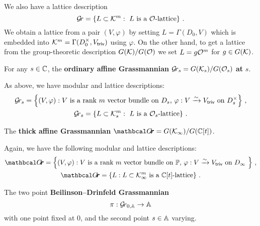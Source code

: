 \documentclass[draft]{article}
\begin{document}
    We also have a lattice description 
    $$ 
    \Gr = \left\{ L \subset \cK^m : \text{ $L$ is a $\cO$-lattice} \right\}\,.
    $$
    We obtain a lattice from a pair $ (V,\varphi) $ by setting $ L = \Gamma(D_0, V)$ which is embedded into $ \cK^m = \Gamma(D_0^\times, \Vtriv)$ using $ \varphi$.  
    On the other hand, to get a lattice from the group-theoretic description $ G(\cK) / G(\cO) $ we set $ L = g \cO^m$ for $ g \in G(\cK)$.
\begin{definition}
 For any $ s \in \CC $, 
    the \textbf{ordinary affine Grassmannian} $\Gr_s = G(\cK_s)/G(\cO_s)$ \textbf{at} $ s $. 
\end{definition}    
As above, we have modular and lattice descriptions:
\begin{gather*}
    \Gr_s = 
    \left\{ (V, \varphi) : \text{$V$ is a rank $m$ vector bundle on $ D_s $, $\varphi : V \xrightarrow{\sim} \Vtriv $ on $ D^\times_s $} \right\}\,, \\
    \Gr_s = \left\{ L \subset \cK_s^m : \text{ $L$ is a $\cO_s$-lattice} \right\} \,. 
\end{gather*}
% 
% 
\begin{definition}
The \textbf{thick affine Grassmannian} $\Grth = G(\Kinf)/G(\CC[t])$.
\end{definition}
Again, we have the following modular and lattice descriptions:
\begin{gather*}
        \Grth = 
        \left\{ (V, \varphi) : \text{$V$ is a rank $m$ vector bundle on $ \PP $, $\varphi : V \xrightarrow{\sim} \Vtriv $ on $ D_\infty $ } \right\}\,, \\
\Grth = \left\{ L : L \subset  \Kinf^m \text{ is a $\CC[t]$-lattice} \right\}\,.
\end{gather*}
% 
\begin{definition} 
    The two point \textbf{Beilinson--Drinfeld Grassmannian} 
    $$\pi : \Grbd\to \AA$$ 
    with one point fixed at 0, and the second point $s\in\AA$ varying.
\end{definition}
\end{document}
